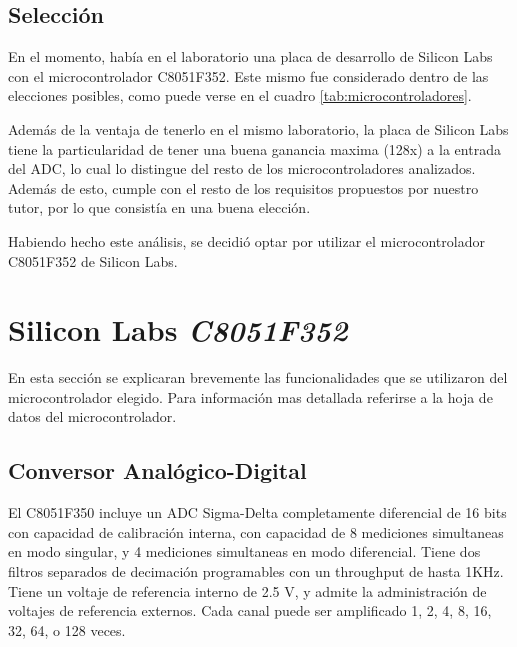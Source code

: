 \documentclass{article}
\theoremstyle{definition}
\theoremstyle{remark}
\begin{document}
\subsection{Selección} %
\label{sub:seleccion}

En el momento, había en el laboratorio una placa de desarrollo de Silicon Labs con el microcontrolador C8051F352. Este mismo fue considerado dentro de las elecciones posibles, como puede verse en el cuadro \ref{tab:microcontroladores}.

Además de la ventaja de tenerlo en el mismo laboratorio, la placa de Silicon Labs tiene la particularidad de tener una buena ganancia maxima (128x) a la entrada del ADC, lo cual lo distingue del resto de los microcontroladores analizados. Además de esto, cumple con el resto de los requisitos propuestos por nuestro tutor, por lo que consistía en una buena elección.

Habiendo hecho este análisis, se decidió optar por utilizar el microcontrolador C8051F352 de Silicon Labs.






\section{Silicon Labs \emph{C8051F352}} %
\label{sec:silicon_labs_c8051f352}

En esta sección se explicaran brevemente las funcionalidades que se utilizaron del microcontrolador elegido. Para información mas detallada referirse a la hoja de datos del microcontrolador. \cite{bib:datasheet}

\subsection{Conversor Analógico-Digital}\label{sec:adc}
El C8051F350 incluye un ADC Sigma-Delta completamente diferencial de 16 bits con capacidad de calibración interna, con capacidad de 8 mediciones simultaneas en modo singular, y 4 mediciones simultaneas en modo diferencial. Tiene dos filtros separados de decimación programables con un throughput de hasta 1KHz. Tiene un voltaje de referencia interno de 2.5 V, y admite la administración de voltajes de referencia externos. Cada canal puede ser amplificado 1, 2, 4, 8, 16, 32, 64, o 128 veces.
\end{document}
